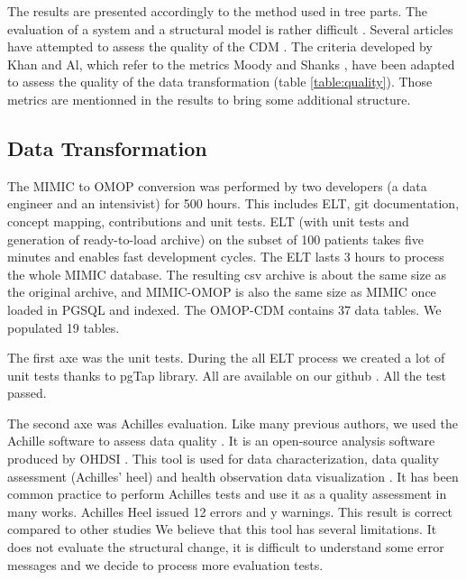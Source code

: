 The results are presented accordingly to the method used in tree parts. The
evaluation of a system and a structural model is rather difficult
\cite{moody-quality}. Several articles have attempted to assess the quality of
the CDM \cite{kahn_data_2012,omop-vs-pcornet}. The criteria developed by Khan
and Al\cite{khan-quality}, which refer to the metrics Moody and Shanks
\cite{moody-quality}, have been adapted to assess the quality of the data
transformation (table \ref{table:quality}). Those metrics are mentionned in the
results to bring some additional structure.

%
% 
\subsection{Data Transformation}

%

The MIMIC to OMOP conversion was performed by two developers (a data engineer
and an intensivist) for 500 hours. This includes ELT, git documentation,
concept mapping, contributions and unit tests. ELT (with unit tests and
generation of ready-to-load archive) on the subset of 100 patients takes five
minutes and enables fast development cycles. The ELT lasts 3 hours to process
the whole MIMIC database. The resulting csv archive is about the same size as
the original archive, and MIMIC-OMOP is also the same size as MIMIC once loaded
in PGSQL and indexed.
The OMOP-CDM contains 37 data tables. We populated 19 tables. 

The first axe was the unit tests. During the all ELT process we created a lot 
of unit tests thanks to pgTap library. 
All are available on our github \cite{mimic-omop-website}. All the test passed.

The second axe was Achilles evaluation. Like many previous authors, 
we used the Achille software to assess data quality \cite{achilles-evaluation}. 
It is an open-source analysis software produced by OHDSI \cite{ohdsi-achilles}.
This tool is used for data characterization, data quality assessment 
(Achilles' heel) and health observation data visualization \cite{ohdsi-achilles}.
It has been common practice to perform Achilles tests and use it as a 
quality assessment in many works. Achilles Heel issued 12 errors and y warnings. 
This result is correct compared to other studies \cite{achilles-evaluation}
We believe that this tool has several limitations. It does not evaluate 
the structural change, it is difficult to understand some error messages and 
we decide to process more evaluation tests.     


